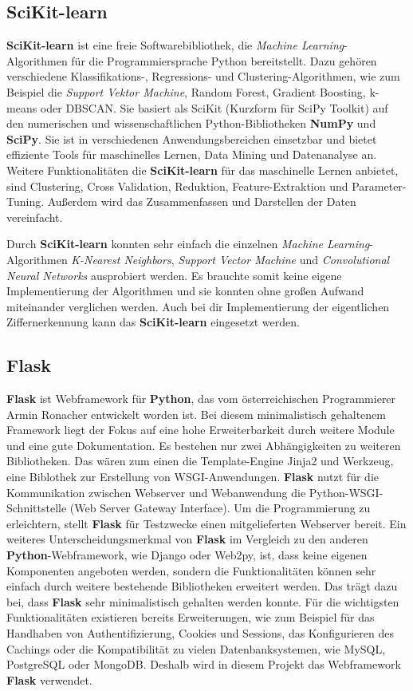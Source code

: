 \subsection{SciKit-learn}
\textbf{SciKit-learn} ist eine freie Softwarebibliothek, die \textit{Machine Learning}-Algorithmen für die Programmiersprache Python bereitstellt. 
Dazu gehören verschiedene Klassifikations-, Regressions- und Clustering-Algorithmen, wie zum Beispiel die \textit{Support Vektor Machine}, 
Random Forest, Gradient Boosting, k-means oder DBSCAN. Sie basiert als SciKit (Kurzform für SciPy Toolkit)
auf den numerischen und wissenschaftlichen Python-Bibliotheken \textbf{NumPy} und \textbf{SciPy}.
Sie ist in verschiedenen Anwendungsbereichen einsetzbar und bietet effiziente Tools für maschinelles Lernen, Data Mining und Datenanalyse an.
Weitere Funktionalitäten die \textbf{SciKit-learn} für das maschinelle Lernen anbietet, sind Clustering, Cross Validation, Reduktion, Feature-Extraktion und Parameter-Tuning.
Außerdem wird das Zusammenfassen und Darstellen der Daten vereinfacht.

Durch \textbf{SciKit-learn} konnten sehr einfach die einzelnen \textit{Machine Learning}-Algorithmen \textit{K-Nearest Neighbors}, \textit{Support Vector Machine} und
\textit{Convolutional Neural Networks} ausprobiert werden. Es brauchte somit keine eigene Implementierung der Algorithmen und sie konnten ohne großen Aufwand
miteinander verglichen werden. Auch bei dir Implementierung der eigentlichen Ziffernerkennung kann das \textbf{SciKit-learn} eingesetzt werden.

\subsection{Flask}
\textbf{Flask} ist Webframework für \textbf{Python}, das vom österreichischen Programmierer Armin Ronacher entwickelt worden ist.
Bei diesem minimalistisch gehaltenem Framework liegt der Fokus auf eine hohe Erweiterbarkeit durch weitere Module und eine gute Dokumentation.
Es bestehen nur zwei Abhängigkeiten zu weiteren Bibliotheken. Das wären zum einen die Template-Engine Jinja2 und Werkzeug, eine Biblothek zur Erstellung
von WSGI-Anwendungen. \textbf{Flask} nutzt für die Kommunikation zwischen Webserver und Webanwendung die Python-WSGI-Schnittstelle (Web Server Gateway Interface).
Um die Programmierung zu erleichtern, stellt \textbf{Flask} für Testzwecke einen mitgelieferten Webserver bereit. Ein weiteres Unterscheidungsmerkmal von \textbf{Flask}
im Vergleich zu den anderen \textbf{Python}-Webframework, wie Django oder Web2py, ist, dass keine eigenen Komponenten angeboten werden, sondern die Funktionalitäten können
sehr einfach durch weitere bestehende Bibliotheken erweitert werden. Das trägt dazu bei, dass \textbf{Flask} sehr minimalistisch gehalten werden konnte.
Für die wichtigsten Funktionalitäten existieren bereits Erweiterungen, wie zum Beispiel für das Handhaben von Authentifizierung, Cookies und Sessions, das Konfigurieren
des Cachings oder die Kompatibilität zu vielen Datenbanksystemen, wie MySQL, PostgreSQL oder MongoDB. 
Deshalb wird in diesem Projekt das Webframework \textbf{Flask} verwendet.

